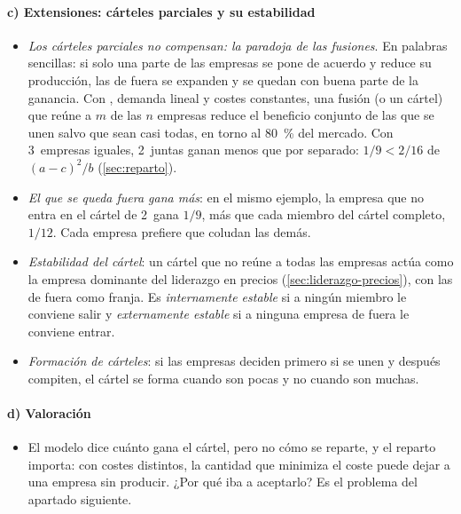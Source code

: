 \documentclass[11pt]{article}
\begin{document}
\paragraph{c) Extensiones: cárteles parciales y su estabilidad}

\begin{itemize}
\item \emph{Los cárteles parciales no compensan: la paradoja de las fusiones}. En palabras sencillas: si solo una parte de las empresas se pone de acuerdo y reduce su producción, las de fuera se expanden y se quedan con buena parte de la ganancia. Con , demanda lineal y costes constantes, una fusión (o un cártel) que reúne a $m$ de las $n$ empresas reduce el beneficio conjunto de las que se unen salvo que sean casi todas, en torno al 80~\% del mercado\nocite{SalantSwitzerReynolds1983Losses}. Con 3~empresas iguales, 2~juntas ganan menos que por separado: $1/9<2/16$ de $(a-c)^2/b$ (\ref{sec:reparto}).
\item \emph{El que se queda fuera gana más}: en el mismo ejemplo, la empresa que no entra en el cártel de 2~gana $1/9$, más que cada miembro del cártel completo, $1/12$. Cada empresa prefiere que coludan las demás\nocite{Stigler1950Monopoly}.
\item \emph{Estabilidad del cártel}\nocite{dAspremontEtAl1983Stability}: un cártel que no reúne a todas las empresas actúa como la empresa dominante del liderazgo en precios (\ref{sec:liderazgo-precios}), con las de fuera como franja. Es \emph{internamente estable} si a ningún miembro le conviene salir y \emph{externamente estable} si a ninguna empresa de fuera le conviene entrar.
\item \emph{Formación de cárteles}: si las empresas deciden primero si se unen y después compiten, el cártel se forma cuando son pocas y no cuando son muchas\nocite{Selten1973Simple}.
\end{itemize}

\paragraph{d) Valoración}

\begin{itemize}
\item El modelo dice cuánto gana el cártel, pero no cómo se reparte, y el reparto importa: con costes distintos, la cantidad que minimiza el coste puede dejar a una empresa sin producir. ¿Por qué iba a aceptarlo? Es el problema del apartado siguiente.
\end{itemize}
\end{document}
